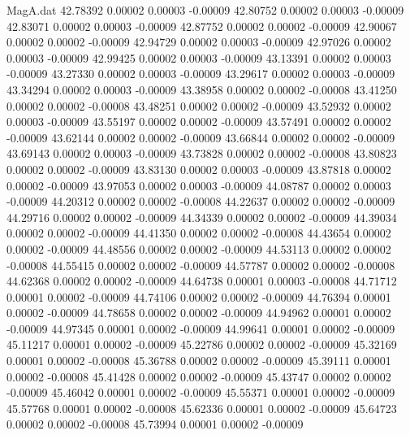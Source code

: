 \begin{filecontents}{MagA.dat}
  42.78392    0.00002    0.00003   -0.00009
  42.80752    0.00002    0.00003   -0.00009
  42.83071    0.00002    0.00003   -0.00009
  42.87752    0.00002    0.00002   -0.00009
  42.90067    0.00002    0.00002   -0.00009
  42.94729    0.00002    0.00003   -0.00009
  42.97026    0.00002    0.00003   -0.00009
  42.99425    0.00002    0.00003   -0.00009
  43.13391    0.00002    0.00003   -0.00009
  43.27330    0.00002    0.00003   -0.00009
  43.29617    0.00002    0.00003   -0.00009
  43.34294    0.00002    0.00003   -0.00009
  43.38958    0.00002    0.00002   -0.00008
  43.41250    0.00002    0.00002   -0.00008
  43.48251    0.00002    0.00002   -0.00009
  43.52932    0.00002    0.00003   -0.00009
  43.55197    0.00002    0.00002   -0.00009
  43.57491    0.00002    0.00002   -0.00009
  43.62144    0.00002    0.00002   -0.00009
  43.66844    0.00002    0.00002   -0.00009
  43.69143    0.00002    0.00003   -0.00009
  43.73828    0.00002    0.00002   -0.00008
  43.80823    0.00002    0.00002   -0.00009
  43.83130    0.00002    0.00003   -0.00009
  43.87818    0.00002    0.00002   -0.00009
  43.97053    0.00002    0.00003   -0.00009
  44.08787    0.00002    0.00003   -0.00009
  44.20312    0.00002    0.00002   -0.00008
  44.22637    0.00002    0.00002   -0.00009
  44.29716    0.00002    0.00002   -0.00009
  44.34339    0.00002    0.00002   -0.00009
  44.39034    0.00002    0.00002   -0.00009
  44.41350    0.00002    0.00002   -0.00008
  44.43654    0.00002    0.00002   -0.00009
  44.48556    0.00002    0.00002   -0.00009
  44.53113    0.00002    0.00002   -0.00008
  44.55415    0.00002    0.00002   -0.00009
  44.57787    0.00002    0.00002   -0.00008
  44.62368    0.00002    0.00002   -0.00009
  44.64738    0.00001    0.00003   -0.00008
  44.71712    0.00001    0.00002   -0.00009
  44.74106    0.00002    0.00002   -0.00009
  44.76394    0.00001    0.00002   -0.00009
  44.78658    0.00002    0.00002   -0.00009
  44.94962    0.00001    0.00002   -0.00009
  44.97345    0.00001    0.00002   -0.00009
  44.99641    0.00001    0.00002   -0.00009
  45.11217    0.00001    0.00002   -0.00009
  45.22786    0.00002    0.00002   -0.00009
  45.32169    0.00001    0.00002   -0.00008
  45.36788    0.00002    0.00002   -0.00009
  45.39111    0.00001    0.00002   -0.00008
  45.41428    0.00002    0.00002   -0.00009
  45.43747    0.00002    0.00002   -0.00009
  45.46042    0.00001    0.00002   -0.00009
  45.55371    0.00001    0.00002   -0.00009
  45.57768    0.00001    0.00002   -0.00008
  45.62336    0.00001    0.00002   -0.00009
  45.64723    0.00002    0.00002   -0.00008
  45.73994    0.00001    0.00002   -0.00009

\end{filecontents}
